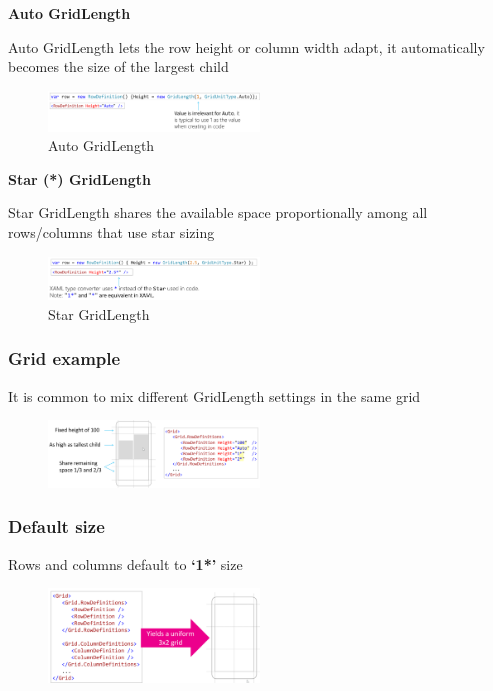 \documentclass{article}
\newcommand{\bold}[1]{\textbf{#1}}
\begin{document}
\bold{Auto GridLength}

Auto GridLength lets the row height or column width adapt, it automatically
becomes the size of the largest child

\begin{figure}[H]
    \centering
    \includegraphics[width=0.5\textwidth]{xaml-grid-length-auto.png}
    \caption{Auto GridLength}
\end{figure}

\bold{Star (*) GridLength}

Star GridLength shares the available space proportionally among all rows/columns
that use star sizing

\begin{figure}[H]
    \centering
    \includegraphics[width=0.5\textwidth]{xaml-grid-length-star.png}
    \caption{Star GridLength}
\end{figure}

\subsubsection{Grid example}

It is common to mix different GridLength settings in the same grid

\begin{figure}[H]
    \centering
    \includegraphics[width=0.5\textwidth]{xaml-grid-example.png}
    \caption{}
\end{figure}

\subsubsection{Default size}

Rows and columns default to \bold{`1*'} size

\begin{figure}[H]
    \centering
    \includegraphics[width=0.5\textwidth]{xaml-grid-defaultsize.png}
    \caption{}
\end{figure}
\end{document}
